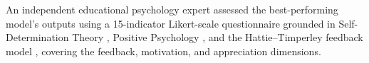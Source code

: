 \documentclass[conference,a4paper]{IEEEtran}
\begin{document}
An independent educational psychology expert
assessed the best-performing model's outputs using
a 15-indicator Likert-scale questionnaire grounded
in Self-Determination Theory
\cite{DeciRyan1985IntrinsicMotivation}, Positive
Psychology \cite{Fredrickson2001BroadenBuild}, and
the Hattie--Timperley feedback model
\cite{HattieTimperley2007PowerOfFeedback}, covering
the feedback, motivation, and appreciation dimensions.



\end{document}
